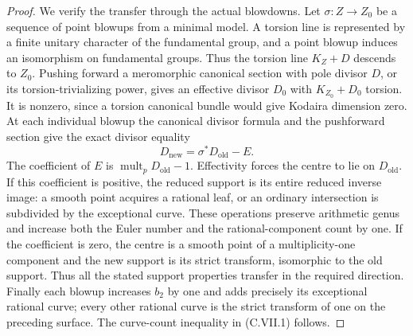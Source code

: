 \begin{proof}
We verify the transfer through the actual blowdowns.
Let $\sigma:Z\to Z_0$ be a sequence of point blowups
from a minimal model. A torsion line is represented by
a finite unitary character of the fundamental group,
and a point blowup induces an isomorphism on fundamental
groups. Thus the torsion line $K_Z+D$ descends to $Z_0$.
Pushing forward a meromorphic canonical section with pole
divisor $D$, or its torsion-trivializing power, gives an
effective divisor $D_0$ with $K_{Z_0}+D_0$ torsion.
It is nonzero, since a torsion canonical bundle would
give Kodaira dimension zero. At each individual blowup
the canonical divisor formula and the pushforward section
give the exact divisor equality
\[
 D_{\mathrm{new}}=\sigma^*D_{\mathrm{old}}-E.
\tag{C.VII.2}
\]
The coefficient of $E$ is
$\operatorname{mult}_pD_{\mathrm{old}}-1$.
Effectivity forces the centre to lie on $D_{\mathrm{old}}$.
If this coefficient is positive, the reduced support
is its entire reduced inverse image: a smooth point
acquires a rational leaf, or an ordinary intersection
is subdivided by the exceptional curve. These operations
preserve arithmetic genus and increase both the Euler
number and the rational-component count by one.
If the coefficient is zero, the centre is a smooth point
of a multiplicity-one component and the new support is
its strict transform, isomorphic to the old support.
Thus all the stated support properties transfer in the
required direction. Finally each blowup increases $b_2$
by one and adds precisely its exceptional rational
curve; every other rational curve is the strict transform
of one on the preceding surface. The curve-count
inequality in (C.VII.1) follows.
\end{proof}

